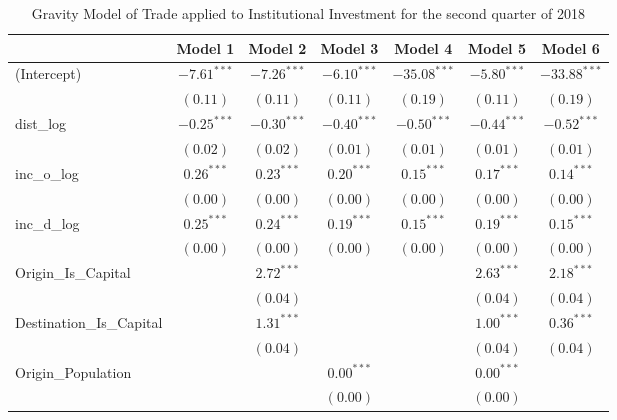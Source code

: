 \begin{table}
	\begin{center}
		\small
		\caption[Gravity Model of trade for Q2 2018]{Gravity Model of Trade applied to Institutional Investment for the second quarter of 2018}
		\begin{tabular}{l c c c c c c }
			\hline
			& Model 1 & Model 2 & Model 3 & Model 4 & Model 5 & Model 6 \\
			\hline
			(Intercept)                  & $-7.61^{***}$ & $-7.26^{***}$ & $-6.10^{***}$ & $-35.08^{***}$ & $-5.80^{***}$ & $-33.88^{***}$ \\
			& $(0.11)$      & $(0.11)$      & $(0.11)$      & $(0.19)$       & $(0.11)$      & $(0.19)$       \\
			dist\_log                    & $-0.25^{***}$ & $-0.30^{***}$ & $-0.40^{***}$ & $-0.50^{***}$  & $-0.44^{***}$ & $-0.52^{***}$  \\
			& $(0.02)$      & $(0.02)$      & $(0.01)$      & $(0.01)$       & $(0.01)$      & $(0.01)$       \\
			inc\_o\_log                  & $0.26^{***}$  & $0.23^{***}$  & $0.20^{***}$  & $0.15^{***}$   & $0.17^{***}$  & $0.14^{***}$   \\
			& $(0.00)$      & $(0.00)$      & $(0.00)$      & $(0.00)$       & $(0.00)$      & $(0.00)$       \\
			inc\_d\_log                  & $0.25^{***}$  & $0.24^{***}$  & $0.19^{***}$  & $0.15^{***}$   & $0.19^{***}$  & $0.15^{***}$   \\
			& $(0.00)$      & $(0.00)$      & $(0.00)$      & $(0.00)$       & $(0.00)$      & $(0.00)$       \\
			Origin\_Is\_Capital          &               & $2.72^{***}$  &               &                & $2.63^{***}$  & $2.18^{***}$   \\
			&               & $(0.04)$      &               &                & $(0.04)$      & $(0.04)$       \\
			Destination\_Is\_Capital     &               & $1.31^{***}$  &               &                & $1.00^{***}$  & $0.36^{***}$   \\
			&               & $(0.04)$      &               &                & $(0.04)$      & $(0.04)$       \\
			Origin\_Population           &               &               & $0.00^{***}$  &                & $0.00^{***}$  &                \\
			&               &               & $(0.00)$      &                & $(0.00)$      &                \\

\end{tabular}
\end{center}
\end{table}
